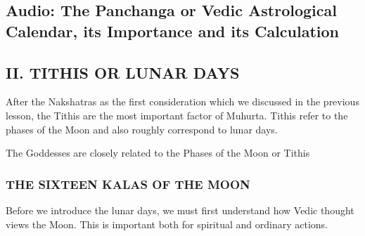  


 


\subsection{\textbf{Audio: The Panchanga or Vedic Astrological Calendar, its Importance and its Calculation}}

\subsection{II. TITHIS OR LUNAR DAYS}

After the Nakshatras as the first consideration which we discussed in the previous lesson, the Tithis are the most important factor of Muhurta. Tithis refer to the phases of the Moon and also roughly correspond to lunar days.

 

The Goddesses are closely related to the Phases of the Moon or Tithis

 


\subsubsection{THE SIXTEEN KALAS OF THE MOON}

Before we introduce the lunar days, we must first understand how Vedic thought views the Moon. This is important both for spiritual and ordinary actions.

 

